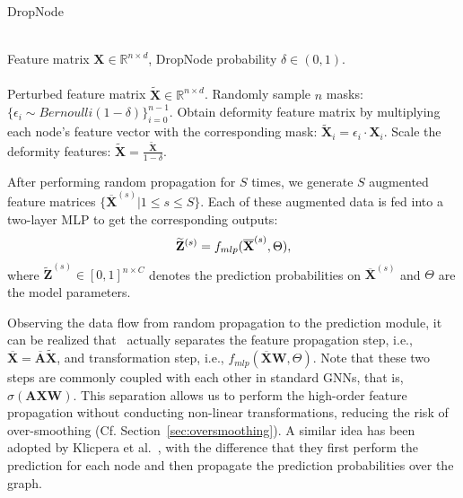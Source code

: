 {\begin{algorithm}[h]
\small
\caption{DropNode}
\label{alg:dropnode}
\begin{algorithmic}[1]
\REQUIRE ~~\\
Feature matrix $\mathbf{X} \in \mathbb{R}^{n \times d}$, DropNode probability 
$\delta \in (0,1)$. \\
\ENSURE ~~\\
Perturbed feature matrix  $\mathbf{\widetilde{X}}\in \mathbb{R}^{n \times d}$.
\STATE Randomly sample $n$ masks: $\{\epsilon_i \sim Bernoulli(1-\delta)\}_{i=0}^{n-1}$.
\STATE Obtain deformity feature matrix by  multiplying each node's feature vector with the corresponding  mask: $\widetilde{\mathbf{X}}_{i} = \epsilon_i \cdot \mathbf{X}_{i} $.
\STATE Scale the deformity features: $\widetilde{\mathbf{X}} = \frac{\widetilde{\mathbf{X}}}{1-\delta}$.
\end{algorithmic}
\end{algorithm}

}









After performing random propagation for $S$ times, we generate $S$ augmented feature matrices $\{\overline{\mathbf{X}}^{(s)}|1\leq s \leq S\}$. 
Each of these augmented data is fed into a two-layer MLP to get the corresponding outputs:
$$
 \small
     \widetilde{\mathbf{Z}}^{(s)} = f_{mlp}(\overline{\mathbf{X}}^{(s)}, \Theta), 
$$
where $\widetilde{\mathbf{Z}}^{(s)} \in [0,1]^{n\times C}$ denotes the prediction probabilities on $\overline{\mathbf{X}}^{(s)}$ and $\Theta$ are the model parameters. 


Observing the data flow from random propagation to the prediction module, it can be realized that \model\ actually separates the feature propagation step, i.e., $\overline{\mathbf{X}} = \overline{\mathbf{A}} \widetilde{\mathbf{X}}$, and transformation step, i.e., $f_{mlp}(\overline{\mathbf{X}} \mathbf{W}, \Theta)$. 
Note that these two steps are commonly coupled with each other in standard GNNs, that is, $\sigma(\mathbf{AX} \mathbf{W})$. 
This separation allows us to perform the high-order feature propagation 
without conducting non-linear transformations, reducing the risk of over-smoothing (Cf. Section~\ref{sec:oversmoothing}). 
A similar idea has been adopted by Klicpera et al.~\cite{klicpera2018predict}, with the difference that they first perform the prediction for each node and then propagate the prediction probabilities over the graph. 












